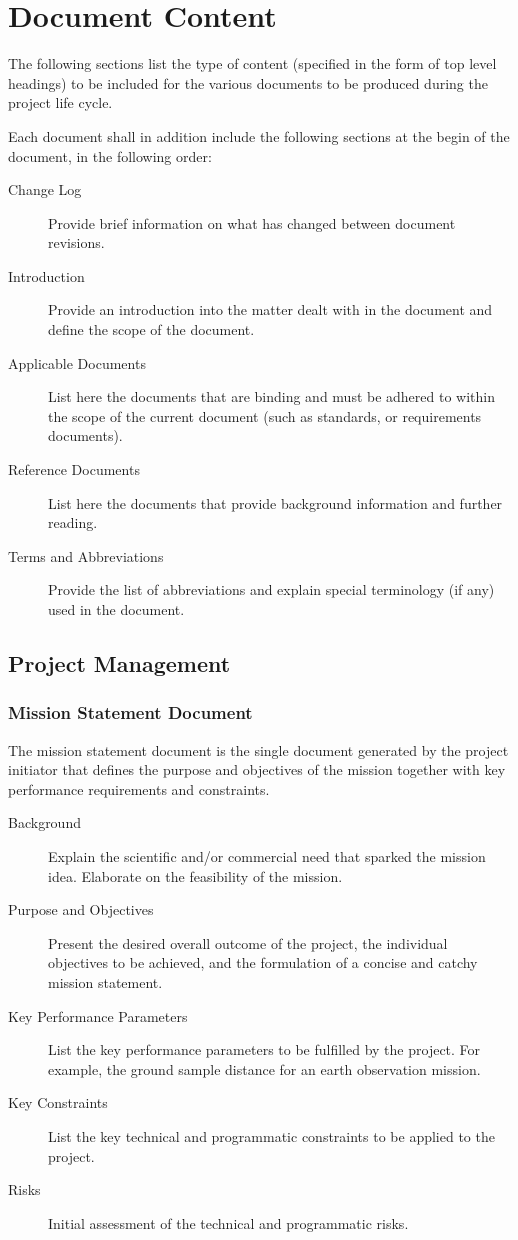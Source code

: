 \chapter{Document Content}

The following sections list the type of content (specified in the form of top level headings) to be included for the various documents to be produced during the project life cycle.

Each document shall in addition include the following sections at the begin of the document, in the following order:

\begin{description}
\item[Change Log]
Provide brief information on what has changed between document revisions.
\item[Introduction]
Provide an introduction into the matter dealt with in the document and define the scope of the document.
\item[Applicable Documents]
List here the documents that are binding and must be adhered to within the scope of the current document (such as standards, or requirements documents).
\item[Reference Documents]
List here the documents that provide background information and further reading.
\item[Terms and Abbreviations]
Provide the list of abbreviations and explain special terminology (if any) used in the document. 
\end{description}


\section{Project Management}


\subsection{Mission Statement Document}
\label{sec:Mission Statement Document}
The mission statement document is the single document generated by the project initiator that defines the purpose and objectives of the mission together with key performance requirements and constraints.

\begin{description}
\item[Background]
Explain the scientific and/or commercial need that sparked the mission idea. Elaborate on the feasibility of the mission. 
\item[Purpose and Objectives]
Present the desired overall outcome of the project, the individual objectives to be achieved, and the formulation of a concise and catchy mission statement. 
\item[Key Performance Parameters]
List the key performance parameters to be fulfilled by the project. For example, the ground sample distance for an earth observation mission. 
\item[Key Constraints]
List the key technical and programmatic constraints to be applied to the project.
\item[Risks]
Initial assessment of the technical and programmatic risks.
\end{description}


